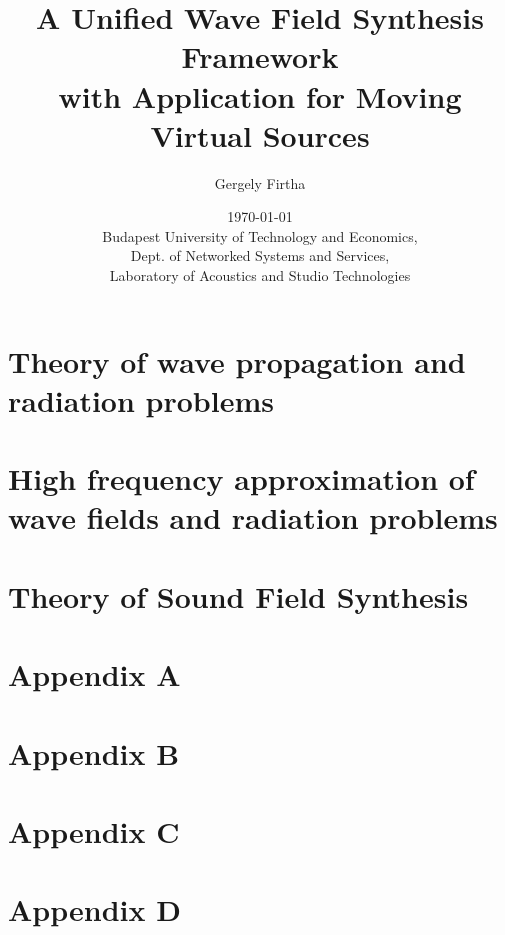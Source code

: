 \documentclass[12pt,a4paper]{report}
\title{A Unified Wave Field Synthesis Framework \\
		\large with Application for Moving Virtual Sources}
\date{\today \\
Budapest University of Technology and Economics, \\ Dept. of Networked Systems and Services, \\ Laboratory of Acoustics and Studio Technologies}
\author{Gergely Firtha}
\begin{document}

\maketitle
\tableofcontents


%
%
\chapter{Theory of wave propagation and radiation problems}
\label{sec:general_wave_theory}

%
%
%
\chapter{High frequency approximation of wave fields and radiation problems}
\label{sec:high_freq_approx}

%
%
%
\chapter{Theory of Sound Field Synthesis}
\label{sec:sound_field_synthesis}

%
%

\begin{appendices}
\chapter{Appendix A}

\chapter{Appendix B}

\chapter{Appendix C}

\chapter{Appendix D}

\end{appendices}




\end{document}
